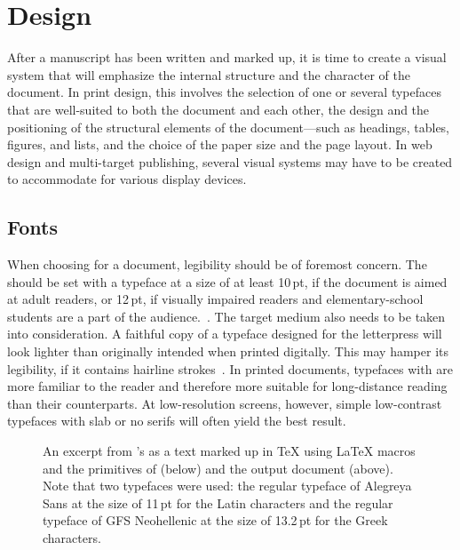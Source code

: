 \chapter{Design}
After a manuscript has been written and marked up, it is time to create a visual
system that will emphasize the internal structure and the character of the
document. In print design, this involves the selection of one or several
typefaces that are well-suited to both the document and each other, the design
and the positioning of the structural elements of the document---such as
headings, tables, figures, and lists, and the choice of the paper size and the
page layout. In web design and multi-target publishing, several visual systems
may have to be created to accommodate for various display devices.

\section{Fonts}
When choosing  for a document, legibility should be of foremost
concern. The  should be set with a typeface at a size of at least
10\,pt, if the document is aimed at adult readers, or 12\,pt, if visually
impaired readers and elementary-school students are a part of the
audience.~\cite[para.\,13--15]{kapr99}. The target medium also needs to be taken
into consideration. A faithful copy of a typeface designed for the letterpress
will look lighter than originally intended when printed digitally. This may
hamper its legibility, if it contains hairline
strokes~\cite[sec.~6.1.2]{bringhurst92}. In printed documents, typefaces with
 are more familiar to the reader and therefore more suitable for
long-distance reading than their  counterparts. At
low-resolution screens, however, simple low-contrast typefaces with slab or no
serifs will often yield the best result.

\begin{figure}
  \vspace{.5em}%
  \vspace{.5em}%
  \caption{An excerpt from 's  as a
    text marked up in \TeX{} using \LaTeX{}
    macros and the primitives of 
    (below) and the output document (above). Note that two typefaces were used:
    the regular typeface of Alegreya Sans at the size of 11\,pt for the Latin
    characters and the regular typeface of GFS Neohellenic at the size of
    13.2\,pt for the Greek characters.}
  \label{fig:cornford12}
\end{figure}

